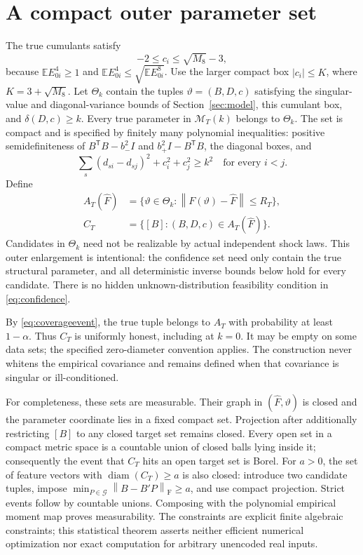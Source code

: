 \documentclass[11pt,a4paper]{article}
\numberwithin{equation}{section}
\newcommand{\E}{\mathbb E}
\newcommand{\cM}{\mathcal M}
\newcommand{\cG}{\mathcal G}
\newcommand{\T}{\mathsf T}
\newcommand{\F}{\mathrm F}
\newcommand{\norm}[1]{\left\lVert #1\right\rVert}
\DeclareMathOperator{\diam}{diam}
\begin{document}
\section{A compact outer parameter set}\label{sec:outer}
The true cumulants satisfy
\[
 -2\le c_i\le\sqrt{M_8}-3,
\]
because \(\E E_{0i}^4\ge1\) and
\(\E E_{0i}^4\le\sqrt{\E E_{0i}^8}\).
Use the larger compact box \(|c_i|\le K\), where \(K=3+\sqrt{M_8}\).
Let \(\Theta_k\) contain the tuples \(\vartheta=(B,D,c)\) satisfying
the singular-value and diagonal-variance bounds of Section~\ref{sec:model},
this cumulant box, and \(\delta(D,c)\ge k\).
Every true parameter in \(\cM_T(k)\) belongs to \(\Theta_k\).
The set is compact and is specified by finitely many polynomial
inequalities: positive semidefiniteness of
\(B^\T B-b_-^2I\) and \(b_+^2I-B^\T B\), the diagonal boxes, and
\[
 \sum_s(d_{si}-d_{sj})^2+c_i^2+c_j^2\ge k^2
 \quad\text{for every }i<j.
\]
Define
\begin{equation}\label{eq:confidence}
 \begin{split}
 A_T(\widehat F)
   &=\{\vartheta\in\Theta_k:\norm{F(\vartheta)-\widehat F}\le R_T\},\\
 C_T&=\{[B]:(B,D,c)\in A_T(\widehat F)\}.
 \end{split}
\end{equation}
Candidates in \(\Theta_k\) need not be realizable by actual independent
shock laws. This outer enlargement is intentional: the confidence set
need only contain the true structural parameter, and all deterministic
inverse bounds below hold for every candidate. There is no hidden
unknown-distribution feasibility condition in \eqref{eq:confidence}.

By \eqref{eq:coverageevent}, the true tuple belongs to \(A_T\) with
probability at least \(1-\alpha\). Thus \(C_T\) is uniformly honest,
including at \(k=0\). It may be empty on some data sets; the specified
zero-diameter convention applies. The construction never whitens the
empirical covariance and remains defined when that covariance is singular
or ill-conditioned.

For completeness, these sets are measurable. Their graph in
\((\widehat F,\vartheta)\) is closed and the parameter coordinate lies in a
fixed compact set. Projection after additionally restricting \([B]\) to
any closed target set remains closed. Every open set in a compact metric
space is a countable union of closed balls lying inside it; consequently
the event that \(C_T\) hits an open target set is Borel.
For \(a>0\), the set of feature vectors with \(\diam(C_T)\ge a\) is also
closed: introduce two candidate tuples, impose
\(\min_{P\in\cG}\norm{B-B'P}_{\F}\ge a\), and use compact projection.
Strict events follow by countable unions. Composing with the polynomial
empirical moment map proves measurability.
The constraints are explicit finite algebraic constraints; this statistical
theorem asserts neither efficient numerical optimization nor exact
computation for arbitrary unencoded real inputs.
\end{document}
